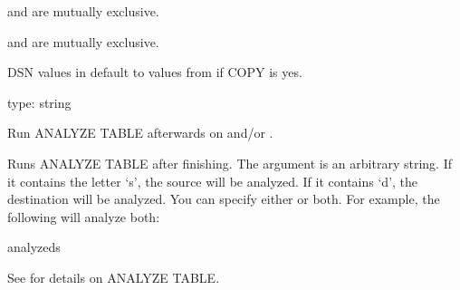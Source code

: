 \documentclass[letterpaper,10pt,english]{sphinxmanual}
\begin{document}
{\hyperref[\detokenize{mariadb-archiver:cmdoption-mariadb-archiver-analyze}]{}} and {\hyperref[\detokenize{mariadb-archiver:cmdoption-mariadb-archiver-optimize}]{}} are mutually exclusive.

{\hyperref[\detokenize{mariadb-archiver:cmdoption-mariadb-archiver-no-ascend}]{}} and {\hyperref[\detokenize{mariadb-archiver:cmdoption-mariadb-archiver-no-delete}]{}} are mutually exclusive.

DSN values in {\hyperref[\detokenize{mariadb-archiver:cmdoption-mariadb-archiver-dest}]{}} default to values from {\hyperref[\detokenize{mariadb-archiver:cmdoption-mariadb-archiver-source}]{}} if COPY is yes.

\begin{fulllineitems}
\label{\detokenize{mariadb-archiver:cmdoption-mariadb-archiver-analyze}}
type: string

Run ANALYZE TABLE afterwards on {\hyperref[\detokenize{mariadb-archiver:cmdoption-mariadb-archiver-source}]{}} and/or {\hyperref[\detokenize{mariadb-archiver:cmdoption-mariadb-archiver-dest}]{}}.

Runs ANALYZE TABLE after finishing.  The argument is an arbitrary string.  If it
contains the letter ‘s’, the source will be analyzed.  If it contains ‘d’, the
destination will be analyzed.  You can specify either or both.  For example, the
following will analyze both:

\begin{sphinxVerbatim}[commandchars=\\\{\}]
\PYGZhy{}\PYGZhy{}analyzeds
\end{sphinxVerbatim}

See  for details on ANALYZE
TABLE.

\end{fulllineitems}
\end{document}
